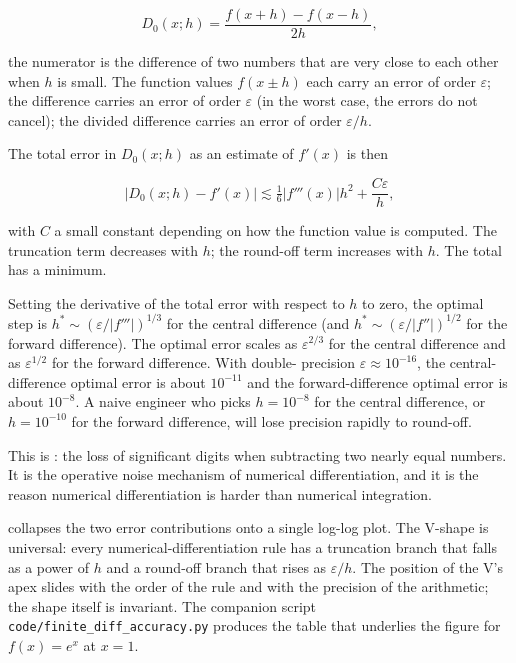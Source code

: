 \[
D_{0}(x; h) = \frac{f(x + h) - f(x - h)}{2 h},
\]

the numerator is the difference of two numbers that are very close
to each other when $h$ is small. The function values
$f(x \pm h)$ each carry an error of order $\varepsilon$; the
difference carries an error of order $\varepsilon$ (in the worst
case, the errors do not cancel); the divided difference carries
an error of order $\varepsilon / h$.

The total error in $D_{0}(x; h)$ as an estimate of $f'(x)$ is then

\[
|D_{0}(x; h) - f'(x)| \lesssim \tfrac{1}{6} |f'''(x)| h^{2} +
\frac{C \varepsilon}{h},
\]

with $C$ a small constant depending on how the function value is
computed. The truncation term decreases with $h$; the round-off
term increases with $h$. The total has a minimum.

Setting the derivative of the total error with respect to $h$ to
zero, the optimal step is $h^{*} \sim (\varepsilon / |f'''|)^{1/3}$
for the central difference (and $h^{*} \sim (\varepsilon /
|f''|)^{1/2}$ for the forward difference). The optimal error scales
as $\varepsilon^{2/3}$ for the central difference and as
$\varepsilon^{1/2}$ for the forward difference. With double-
precision $\varepsilon \approx 10^{-16}$, the central-difference
optimal error is about $10^{-11}$ and the forward-difference
optimal error is about $10^{-8}$. A naive engineer who picks $h =
10^{-8}$ for the central difference, or $h = 10^{-10}$ for the
forward difference, will lose precision rapidly to round-off.

This is : the loss of significant
digits when subtracting two nearly equal numbers. It is the
operative noise mechanism of numerical differentiation, and it is
the reason numerical differentiation is harder than numerical
integration.



 collapses the two error
contributions onto a single log-log plot. The V-shape is universal:
every numerical-differentiation rule has a truncation branch that
falls as a power of $h$ and a round-off branch that rises as
$\varepsilon / h$. The position of the V's apex slides with the
order of the rule and with the precision of the arithmetic; the
shape itself is invariant. The companion script
\texttt{code/finite\_diff\_accuracy.py} produces the table that
underlies the figure for $f(x) = e^{x}$ at $x = 1$.

